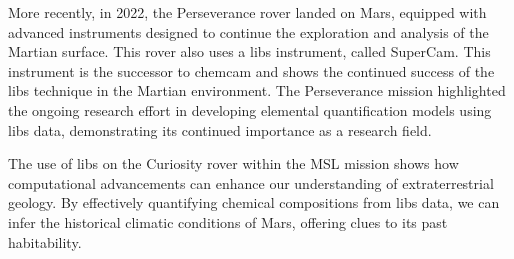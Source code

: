 More recently, in 2022, the Perseverance rover landed on Mars, equipped with advanced instruments designed to continue the exploration and analysis of the Martian surface. This rover also uses a \gls{libs} instrument, called SuperCam. This instrument is the successor to \gls{chemcam} and shows the continued success of the \gls{libs} technique in the Martian environment. The Perseverance mission highlighted the ongoing research effort in developing elemental quantification models using \gls{libs} data\cite{andersonPostlandingMajorElement2022}, demonstrating its continued importance as a research field.

The use of \gls{libs} on the Curiosity rover within the MSL mission shows how computational advancements can enhance our understanding of extraterrestrial geology. By effectively quantifying chemical compositions from \gls{libs} data, we can infer the historical climatic conditions of Mars, offering clues to its past habitability.
